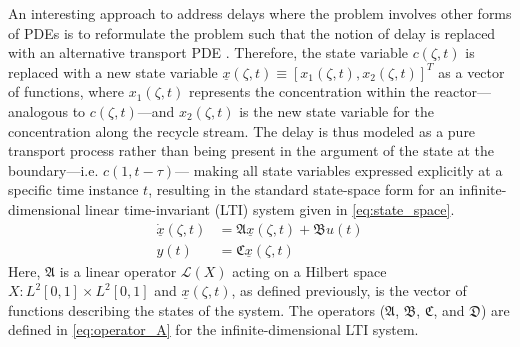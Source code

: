 An interesting approach to address delays where the problem involves other forms of PDEs is to reformulate the problem such that the notion of delay is replaced with an alternative transport PDE \cite{krstic2009book}. 
Therefore, the state variable $c(\zeta,t)$ is replaced with a new state variable $\underline{x}(\zeta, t) \equiv [x_1(\zeta, t), x_2(\zeta, t)]^T$ as a vector of functions, where $x_1(\zeta, t)$ represents the concentration within the reactor—analogous to $c(\zeta,t)$—and $x_2(\zeta, t)$ is the new state variable for the concentration along the recycle stream. The delay is thus modeled as a pure transport process rather than being present in the argument of the state at the boundary—i.e. $c(1,t-\tau)$— making all state variables expressed explicitly at a specific time instance $t$, resulting in the standard state-space form for an infinite-dimensional linear time-invariant (LTI) system given in \eqref{eq:state_space}.
\begin{equation} \label{eq:state_space}
    \begin{aligned}
        \dot{\underline{x}}(\zeta, t) &= \mathfrak{A} \underline{x}(\zeta, t) + \mathfrak{B} u(t) \\
        y(t) &= \mathfrak{C} \underline{x}(\zeta, t)
    \end{aligned}
\end{equation}
Here, $\mathfrak{A}$ is a linear operator $\mathcal{L}(X)$ acting on a Hilbert space $X: L^2[0,1] \times L^2[0,1]$ and $\underline{x}(\zeta,t)$, as defined previously, is the vector of functions describing the states of the system. The operators ($\mathfrak{A}$, $\mathfrak{B}$, $\mathfrak{C}$, and $\mathfrak{D}$) are defined in \eqref{eq:operator_A} for the infinite-dimensional LTI system.


